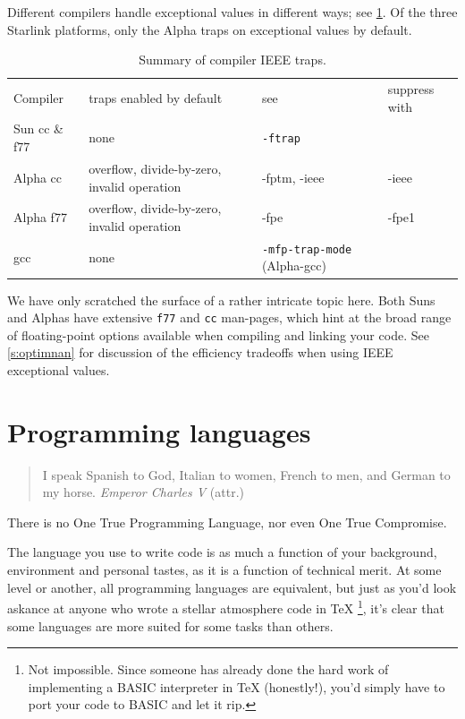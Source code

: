 \documentclass[11pt,oneside,chapters]{starlink}
\begin{document}
Different compilers handle exceptional values in different
ways; see \ref{t:traptab}.  Of the three Starlink platforms,
only the Alpha traps on exceptional values by
default.

\begin{table}
\caption{
Summary of compiler IEEE traps.
\label{t:traptab}
}
\begin{tabular}{llll}
Compiler      & traps enabled by default                    & see                                 & suppress with \\
Sun cc \& f77 & none                                        & \texttt{-ftrap}                     & \\
Alpha cc      & overflow, divide-by-zero, invalid operation & -fptm, -ieee                        & -ieee \\
Alpha f77     & overflow, divide-by-zero, invalid operation & -fpe                                & -fpe1 \\
gcc           & none                                        & \texttt{-mfp-trap-mode} (Alpha-gcc) & \\
\end{tabular}
\end{table}

We have only scratched the surface of a rather
intricate topic here.  Both Suns and Alphas have
extensive \texttt{f77} and \texttt{cc}
man-pages, which hint at the broad range of
floating-point options available when compiling and
linking your code.  See \ref{s:optimnan} for
discussion of the efficiency tradeoffs when using IEEE
exceptional values.


\section{Programming languages}
\label{s:progs}


\begin{quotation}
I speak Spanish to God, Italian to women, French to
men, and German to my horse.
\emph{Emperor Charles V} (attr.)
\end{quotation}

There is no One True Programming Language, nor even One True
Compromise.

The language you use to write code is as much a function of your
background, environment and personal tastes, as it is a function of
technical merit.  At some level or another, all programming languages
are equivalent, but just as you'd look askance at anyone who wrote a
stellar atmosphere code in TeX
\footnote{Not impossible.  Since
someone has already done the hard work of implementing a
BASIC interpreter in TeX (honestly!), you'd simply have to
port your code to BASIC and let it rip.},
it's clear that
some languages are more suited for some tasks than others.
\end{document}
